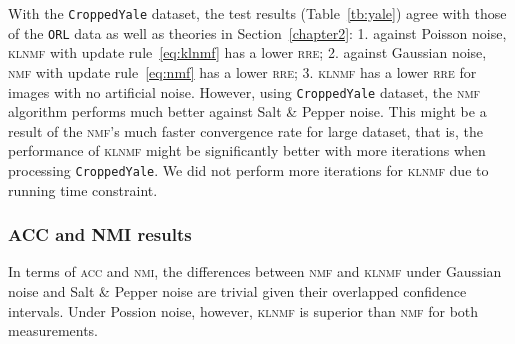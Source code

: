 With the \texttt{CroppedYale} dataset, the test results (Table~\ref{tb:yale}) agree with those of the \texttt{ORL} data as well as theories in Section~\ref{chapter2}: 1. against Poisson noise, \textsc{klnmf} with update rule~\eqref{eq:klnmf} has a lower \textsc{rre}; 2. against Gaussian noise, \textsc{nmf} with update rule~\eqref{eq:nmf} has a lower \textsc{rre}; 3. \textsc{klnmf} has a lower \textsc{rre} for images with no artificial noise. However, using \texttt{CroppedYale} dataset, the \textsc{nmf} algorithm performs much better against Salt \& Pepper noise. This might be a result of the \textsc{nmf}'s much faster convergence rate for large dataset, that is, the performance of \textsc{klnmf} might be significantly better with more iterations when processing \texttt{CroppedYale}. We did not perform more iterations for \textsc{klnmf} due to running time constraint.

\subsubsection{ACC and NMI results}
In terms of \textsc{acc} and \textsc{nmi}, the differences between \textsc{nmf} and \textsc{klnmf} under Gaussian noise and Salt \& Pepper noise are trivial given their overlapped confidence intervals. Under Possion noise, however, \textsc{klnmf} is superior than \textsc{nmf} for both measurements. 



